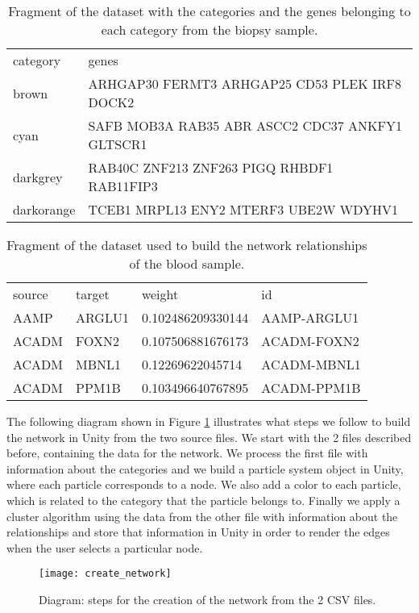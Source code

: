 \begin{table}[h!]
\centering
\begin{tabular}{ll}
\hline
category & genes          \\
brown   & ARHGAP30 FERMT3 ARHGAP25 CD53 PLEK IRF8 DOCK2\\
cyan  & SAFB MOB3A RAB35 ABR ASCC2 CDC37 ANKFY1 GLTSCR1\\
darkgrey  & RAB40C ZNF213 ZNF263 PIGQ RHBDF1 RAB11FIP3\\
darkorange  & TCEB1 MRPL13 ENY2 MTERF3 UBE2W WDYHV1\\
\hline
\end{tabular}
\caption{Fragment of the dataset with the categories and the genes belonging to each category from the biopsy sample.}
\label{tab:categories-data}
\end{table}

\begin{table}[h!]
\centering
\begin{tabular}{llll}
\hline
source & target & weight            & id          \\
AAMP   & ARGLU1 & 0.102486209330144 & AAMP-ARGLU1 \\
ACADM  & FOXN2  & 0.107506881676173 & ACADM-FOXN2 \\
ACADM  & MBNL1  & 0.12269622045714  & ACADM-MBNL1 \\
ACADM  & PPM1B  & 0.103496640767895 & ACADM-PPM1B \\
\hline
\end{tabular}
\caption{Fragment of the dataset used to build the network relationships of the blood sample.}
\label{tab:network-data}
\end{table}

The following diagram shown in Figure \ref{fig:create_network} illustrates what steps we follow to build the network in Unity from the two source files. We start with the 2 files described before, containing the data for the network. We process the first file with information about the categories and we build a particle system object in Unity, where each particle corresponds to a node. We also add a color to each particle, which is related to the category that the particle belongs to. Finally we apply a cluster algorithm using the data from the other file with information about the relationships and store that information in Unity in order to render the edges when the user selects a particular node.

\begin{figure}[h!]
    \centering%
    \texttt{[image: create\_network]}
    \caption{Diagram: steps for the creation of the network from the 2 CSV files.}
    \label{fig:create_network}
\end{figure}%

